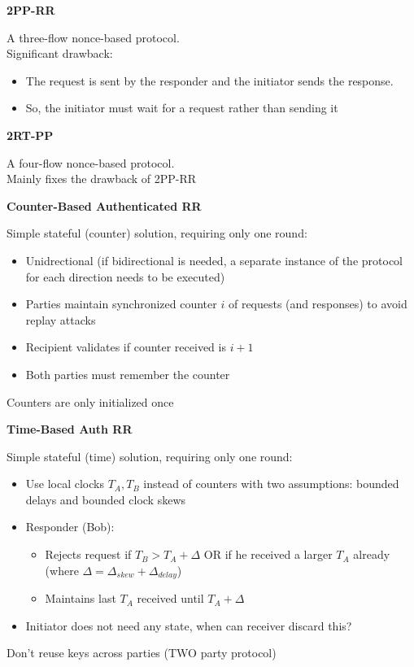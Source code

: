 \documentclass{article}
\begin{document}
\textbf{2PP-RR}

A three-flow nonce-based protocol.\\
Significant drawback:\begin{itemize}
	\item The request is sent by the responder and the initiator sends the response.
	\item So, the initiator must wait for a request rather than sending it
\end{itemize}

\textbf{2RT-PP}

A four-flow nonce-based protocol.\\
Mainly fixes the drawback of 2PP-RR

\textbf{Counter-Based Authenticated RR}

Simple stateful (counter) solution, requiring only one round:\begin{itemize}
	\item Unidrectional (if bidirectional is needed, a separate instance of the protocol for each direction needs to be executed)
	\item Parties maintain synchronized counter $i$ of requests (and responses) to avoid replay attacks
	\item Recipient validates if counter received is $i+1$
	\item Both parties must remember the counter
\end{itemize}
Counters are only initialized once

\textbf{Time-Based Auth RR}

Simple stateful (time) solution, requiring only one round:\begin{itemize}
	\item Use local clocks $T_A,T_B$ instead of counters with two assumptions: bounded delays and bounded clock skews
	\item Responder (Bob):\begin{itemize}
			\item Rejects request if $T_B>T_A+\Delta$ OR if he received a larger $T_A$ already (where $\Delta=\Delta_{skew}+\Delta_{delay}$)
			\item Maintains last $T_A$ received until $T_A+\Delta$
		\end{itemize}
	\item Initiator does not need any state, when can receiver discard this?
\end{itemize}
Don't reuse keys across parties (TWO party protocol)
\end{document}
